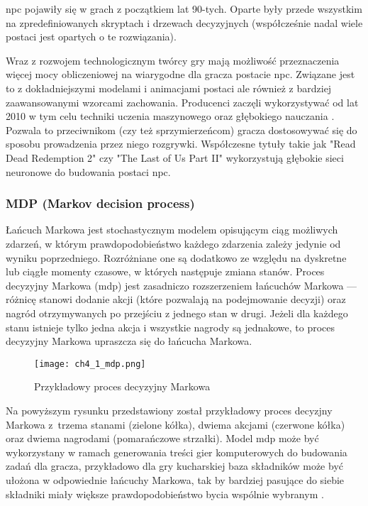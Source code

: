 \gls{npc} pojawiły się w grach z początkiem lat 90-tych. Oparte były przede wszystkim na zpredefiniowanych
skryptach i drzewach decyzyjnych\cite{storytelling_through} (współcześnie nadal wiele postaci jest
opartych o te rozwiązania)\cite{from_pong_to_narrative}.

Wraz z rozwojem technologicznym twórcy gry mają możliwość przeznaczenia więcej mocy obliczeniowej
na wiarygodne dla gracza postacie \gls{npc}. Związane jest to z dokładniejszymi modelami i animacjami
postaci ale również z bardziej zaawansowanymi wzorcami zachowania. Producenci zaczęli wykorzystywać
od lat 2010 w tym celu techniki uczenia maszynowego oraz głębokiego nauczania
\cite{from_pong_to_narrative}. Pozwala to przeciwnikom (czy też sprzymierzeńcom) gracza
dostosowywać się do sposobu prowadzenia przez niego rozgrywki. Współczesne tytuły takie jak
"Read Dead Redemption 2" czy "The Last of Us Part II" wykorzystują głębokie sieci neuronowe do
budowania postaci \gls{npc}\cite{from_pong_to_narrative}.

\subsubsection*{MDP (Markov decision process)}

Łańcuch Markowa jest stochastycznym modelem opisującym ciąg możliwych zdarzeń, w którym
prawdopodobieństwo każdego zdarzenia zależy jedynie od wyniku poprzedniego. Rozróżniane one
są dodatkowo ze względu na dyskretne lub ciągłe momenty czasowe, w których następuje zmiana
stanów. Proces decyzyjny Markowa (\gls{mdp}) jest zasadniczo rozszerzeniem łańcuchów Markowa ---
różnicę stanowi dodanie akcji (które pozwalają na podejmowanie decyzji) oraz nagród otrzymywanych
po przejściu z jednego stan w drugi. Jeżeli dla każdego stanu istnieje tylko jedna akcja i
wszystkie nagrody są jednakowe, to proces decyzyjny Markowa upraszcza się do łańcucha Markowa.

\begin{figure}[h]
    \centering
    \texttt{[image: ch4\_1\_mdp.png]}
    \caption{Przykładowy proces decyzyjny Markowa}
    \label{fig:ch4_1_mdp}
\end{figure}

Na powyższym rysunku przedstawiony został przykładowy proces decyzjny Markowa z~trzema stanami (zielone
kółka), dwiema akcjami (czerwone kółka) oraz dwiema nagrodami (pomarańczowe strzałki). Model \gls{mdp} może
być wykorzystany w ramach generowania treści gier komputerowych do budowania zadań dla gracza,
przykładowo dla gry kucharskiej baza składników może być ułożona w odpowiednie łańcuchy Markowa, tak
by bardziej pasujące do siebie składniki miały większe prawdopodobieństwo bycia wspólnie wybranym
\cite{ammanabrolu2020automated}.

